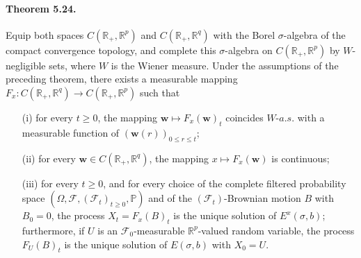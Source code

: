 \documentclass{article}
\numberwithin{equation}{section}
\newcommand{\bfw}{\mathbf{w}}
\renewcommand{\P}{\mathbb{P}}
\theoremstyle{plain}
\theoremstyle{definition}
\begin{document}
\paragraph{Theorem 5.24.\label{thm:5.24}} Equip both spaces $C(\mathbb{R}_+,\mathbb{R}^p)$ and $C(\mathbb{R}_+,\mathbb{R}^q)$ with the Borel $\sigma$-algebra of the compact convergence topology, and complete this $\sigma$-algebra on $C(\mathbb{R}_+,\mathbb{R}^p)$ by $W$-negligible sets, where $W$ is the Wiener measure. Under the assumptions of the preceding theorem, there exists a measurable mapping $F_x:C(\mathbb{R}_+,\mathbb{R}^q)\to C(\mathbb{R}_+,\mathbb{R}^p)$ such that
\begin{itemize}
	\item[(i)] for every $t\geq 0$, the mapping $\bfw\mapsto F_x(\bfw)_t$ coincides $W$-$a.s.$ with a measurable function of $(\bfw(r))_{0\leq r\leq t}$;
	\item[(ii)] for every $\bfw\in C(\mathbb{R}_+,\mathbb{R}^q)$, the mapping $x\mapsto F_x(\bfw)$ is continuous;
	\item[(iii)] for every $t\geq 0$, and for every choice of the complete filtered probability space $(\Omega,\mathscr{F},(\mathscr{F}_t)_{t\geq 0},\P)$ and of the $(\mathscr{F}_t)$-Brownian motion $B$ with $B_0=0$, the process $X_t=F_x(B)_t$ is the unique solution of $E^x(\sigma,b)$; furthermore, if $U$ is an $\mathscr{F}_0$-measurable $\mathbb{R}^p$-valued random variable, the process $F_U(B)_t$ is the unique solution of $E(\sigma,b)$ with $X_0=U$.
\end{itemize}
\end{document}
